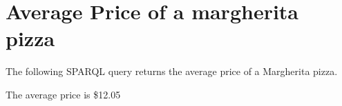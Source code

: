 \documentclass[11pt]{report} %
\begin{document}



	

\section{Average Price of a margherita pizza}

The following SPARQL query returns the average price of a Margherita pizza.



The average price is \$12.05
\end{document}
